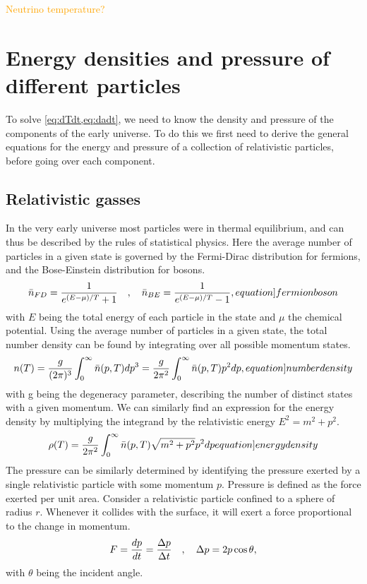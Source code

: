 \textcolor{orange}{Neutrino temperature?}


\section{Energy densities and pressure of different particles}
To solve \cref{eq:dTdt,eq:dadt}, we need to know the density and pressure of the components of the early universe. To do this we first need to derive the general equations for the energy and pressure of a collection of relativistic particles, before going over each component.

\subsection{Relativistic gasses}
In the very early universe most particles were in thermal equilibrium, and can thus be described by the rules of statistical physics. Here the average number of particles in a given state is governed by the Fermi-Dirac distribution for fermions, and the Bose-Einstein distribution for bosons.
\begin{align}
    \bar{n}_{FD}=\frac{1}{e^{(E-\mu)/T}+1} \eqsep   \bar{n}_{BE}=\frac{1}{e^{(E-\mu)/T}-1},
    \label[equation]{fermionboson}
\end{align}
with $E$ being the total energy of each particle in the state and $\mu$ the chemical potential. Using the average number of particles in a given state, the total number density can be found by integrating over all possible momentum states. 
\begin{align}
    n(T)=\frac{g}{(2\pi)^3}\int_{0}^{\infty}\bar{n}(p,T)dp^3=\frac{g}{2\pi^2}\int_{0}^{\infty}\bar{n}(p,T) p^2 dp,
    \label[equation]{numberdensity}
\end{align}
with g being the degeneracy parameter, describing the number of distinct states with a given momentum. We can similarly find an expression for the energy density by multiplying the integrand by the relativistic energy $E^2=m^2+p^2$.
\begin{align}
    \rho(T)=\frac{g}{2\pi^2}\int_{0}^{\infty}\bar{n}(p,T)\sqrt{m^2+p^2} p^2 dp
    \label[equation]{energydensity}
\end{align}
The pressure can be similarly determined by identifying the pressure exerted by a single relativistic particle with some momentum $p$.
Pressure is defined as the force exerted per unit area. Consider a relativistic particle confined to a sphere of radius $r$. Whenever it collides with the surface, it will exert a force proportional to the change in momentum. 
\begin{align}
    F=\frac{dp}{dt}=\frac{\Delta p }{\Delta t}\quad , \quad
    \Delta p = 2p \cos \theta,
    \label{eq:pressureF}
\end{align}
with $\theta$ being the incident angle. 

